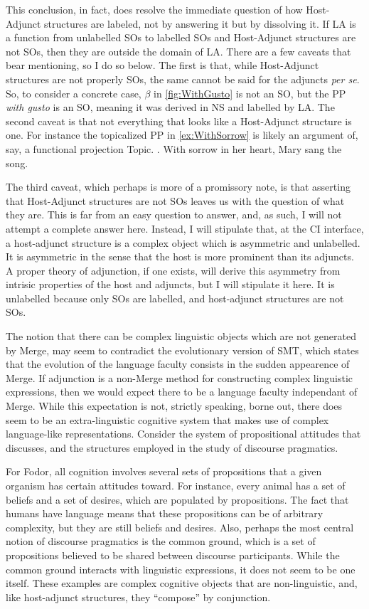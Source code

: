 \documentclass[MilwayThesis]{subfiles}
\begin{document}
This conclusion, in fact, does resolve the immediate question of how Host-Adjunct structures are labeled, not by answering it but by dissolving it.
If LA is a function from unlabelled SOs to labelled SOs and Host-Adjunct structures are not SOs, then they are outside the domain of LA.
There are a few caveats that bear mentioning, so I do so below.
The first is that, while Host-Adjunct structures are not properly SOs, the same cannot be said for the adjuncts \textit{per se}.
So, to consider a concrete case, $\beta$ in \cref{fig:WithGusto} is not an SO, but the PP \textit{with gusto} is an SO, meaning it was derived in NS and labelled by LA.
The second caveat is that not everything that looks like a Host-Adjunct structure is one.
For instance the topicalized PP in \cref{ex:WithSorrow} is likely an argument of, say, a functional projection Topic.
\ex.\label{ex:WithSorrow} With sorrow in her heart, Mary sang the song.

The third caveat, which perhaps is more of a promissory note, is that asserting that Host-Adjunct structures are not SOs leaves us with the question of what they are.
This is far from an easy question to answer, and, as such, I will not attempt a complete answer here.
Instead, I will stipulate that, at the CI interface, a host-adjunct structure is a complex object which is asymmetric and unlabelled.
It is asymmetric in the sense that the host is more prominent than its adjuncts.
A proper theory of adjunction, if one exists, will derive this asymmetry from intrisic properties of the host and adjuncts, but I will stipulate it here.
It is unlabelled because only SOs are labelled, and host-adjunct structures are not SOs.

The notion that there can be complex linguistic objects which are not generated by Merge, may seem to contradict the evolutionary version of SMT, which states that the evolution of the language faculty consists in the sudden appearence of Merge.
If adjunction is a non-Merge method for constructing complex linguistic expressions, then we would expect there to be a language faculty independant of Merge.
While this expectation is not, strictly speaking, borne out, there does seem to be an extra-linguistic cognitive system that makes use of complex language-like representations.
Consider the system of propositional attitudes that \textcite{fodor1975language} discusses, and the structures employed in the study of discourse pragmatics.

For Fodor, all cognition involves several sets of propositions that a given organism has certain attitudes toward.
For instance, every animal has a set of beliefs and a set of desires, which are populated by propositions.
The fact that humans have language means that these propositions can be of arbitrary complexity, but they are still beliefs and desires.
Also, perhaps the most central notion of discourse pragmatics is the common ground, which is a set of propositions believed to be shared between discourse participants.
While the common ground interacts with linguistic expressions, it does not seem to be one itself.
These examples are complex cognitive objects that are non-linguistic, and, like host-adjunct structures, they ``compose'' by conjunction.
\end{document}
